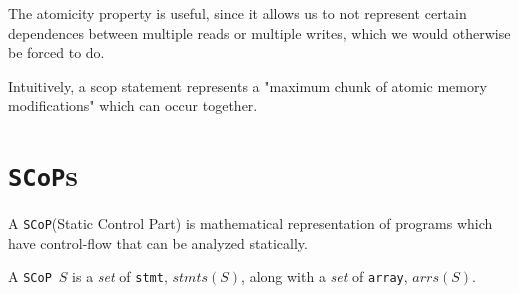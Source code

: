 \documentclass{article}
\newcommand{\scop}{\texttt{SCoP}}
\newcommand{\scops}{\scop s}
\newcommand{\stmt}{\texttt{stmt}}
\newcommand{\arr}{\texttt{array}}
\begin{document}
The atomicity property is useful, since it allows us to not represent certain
dependences between multiple reads or multiple writes, which we would
otherwise be forced to do.

Intuitively, a scop statement represents a "maximum chunk of atomic memory
modifications" which can occur together.

\section{\scops}
A \scop (Static Control Part) is mathematical representation of programs
which have control-flow that can be analyzed statically.

A \scop~$S$ is a \textit{set} of \stmt, $stmts(S)$, along with a \textit{set}
of \arr, $arrs(S)$.
\end{document}
